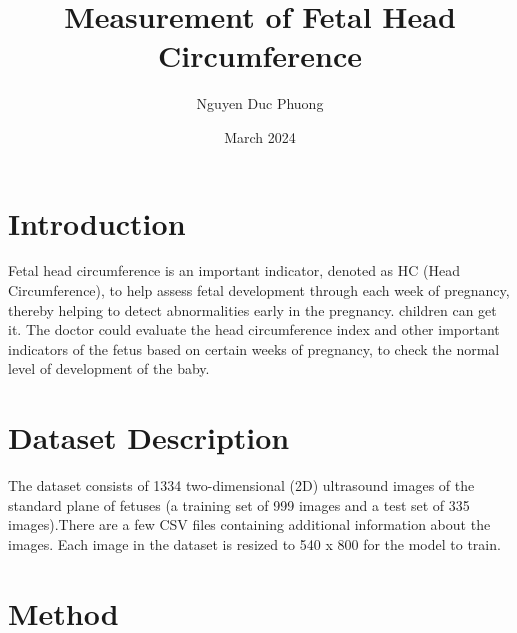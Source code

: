 \documentclass[conference]{article}
\title{Measurement of Fetal Head Circumference}
\author{Nguyen Duc Phuong}
\date{March 2024}
\begin{document}
\maketitle

\section{Introduction}

Fetal head circumference is an important indicator, denoted as HC (Head Circumference), to help assess fetal development through each week of pregnancy, thereby helping to detect abnormalities early in the pregnancy. children can get it. The doctor could evaluate the head circumference index and other important indicators of the fetus based on certain weeks of pregnancy, to check the normal level of development of the baby. \\

\section{Dataset Description}

The dataset consists of 1334 two-dimensional (2D) ultrasound images of the standard plane of fetuses (a training set of 999 images and a test set of 335 images).There are a few CSV files containing additional information about the images. Each image in the dataset is resized to 540 x 800 for the model to train.  \\


\section{Method}
\end{document}
